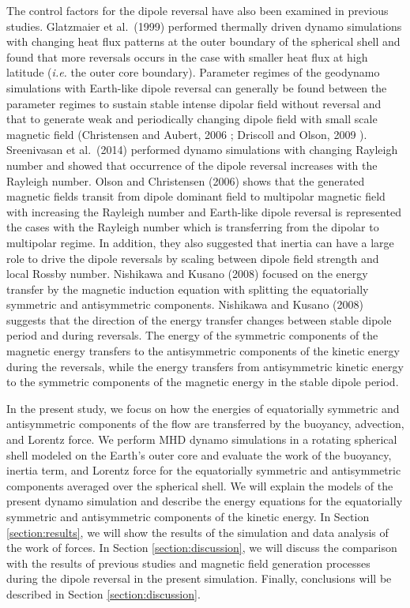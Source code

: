 The control factors for the dipole reversal have also been %
{\color{red} examined in} previous studies.
Glatzmaier et al.\ (1999) \cite{Glatzmaier:1999} performed thermally driven dynamo simulations with changing heat flux patterns at the outer boundary of the spherical shell and found that more reversals occurs in the case with smaller heat flux at high latitude ({\it i.e.} the outer core boundary).
Parameter regimes of the geodynamo simulations with Earth-like dipole reversal can generally be found between the parameter regimes to sustain stable intense dipolar field without reversal and that to generate weak and periodically changing dipole field with small scale magnetic field (Christensen and Aubert, 2006 \cite{aubert:2006}; Driscoll and Olson, 2009 \cite{driscoll:2009}).
Sreenivasan et al.\ (2014) \cite{Sreenivasan:2014} performed dynamo simulations with changing Rayleigh number and showed that occurrence of the dipole reversal increases with the Rayleigh number. 
Olson and Christensen (2006) \cite{Olson:2006} shows that the generated magnetic fields transit from dipole dominant field to multipolar magnetic field with increasing the Rayleigh number and Earth-like dipole reversal is represented the cases with the Rayleigh number which is transferring from the dipolar to multipolar regime. 
In addition, they also suggested that inertia can have a large role to drive the dipole reversals by scaling between dipole field strength and local Rossby number.
Nishikawa and Kusano (2008) \cite{Nishikawa:2008} focused on the energy transfer by the magnetic induction equation with splitting the equatorially symmetric and antisymmetric components. 
Nishikawa and Kusano (2008) suggests that the direction of the energy transfer changes between stable dipole period and during reversals. 
The energy of the symmetric components of the magnetic energy transfers to the antisymmetric components of the kinetic energy during the reversals, while the energy transfers from antisymmetric kinetic energy to the symmetric components of the magnetic energy in the stable dipole period.

In the present study, we focus on how the energies of equatorially symmetric and antisymmetric components of the flow are transferred by the buoyancy, advection, and Lorentz force. 
We perform MHD dynamo simulations in a rotating spherical shell modeled on the Earth's outer core and evaluate the work of the buoyancy, inertia term, and Lorentz force for the equatorially symmetric and antisymmetric components averaged over the spherical shell. 
We will explain the models of the present dynamo simulation and describe the energy equations for the equatorially symmetric and antisymmetric components of the kinetic energy. 
In Section \ref{section:results}, we will show the results of the simulation and data analysis of the work of forces. 
In Section \ref{section:discussion}, we will discuss the comparison with the results of previous studies and magnetic field generation processes during the dipole reversal in the present simulation. 
Finally, conclusions will be described in Section \ref{section:discussion}.
